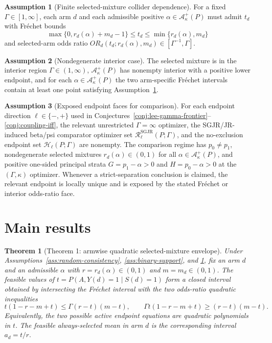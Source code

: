 \documentclass[11pt]{article}
\theoremstyle{definition}
\newtheorem{assumption}{Assumption}
\theoremstyle{plain}
\newtheorem{theorem}{Theorem}
\theoremstyle{remark}
\begin{document}
\begin{assumption}[Finite selected-mixture collider dependence]\label{ass:gamma-mixture}
For a fixed \(\Gamma\in[1,\infty]\), each arm \(d\) and each admissible positive \(\alpha\in\mathcal A_\kappa^+(P)\) must admit \(t_d\) with Fréchet bounds
\[
  \max\{0,r_d(\alpha)+m_d-1\}\le t_d\le \min\{r_d(\alpha),m_d\}
\]
and selected-arm odds ratio \(OR_d(t_d;r_d(\alpha),m_d)\in[\Gamma^{-1},\Gamma]\).
\end{assumption}

\begin{assumption}[Nondegenerate interior case]\label{ass:interior}
The selected mixture is in the interior region \(\Gamma\in(1,\infty)\), \(\mathcal A_\kappa^+(P)\) has nonempty interior with a positive lower endpoint, and for each \(\alpha\in\mathcal A_\kappa^+(P)\) the two arm-specific Fréchet intervals contain at least one point satisfying Assumption~\ref{ass:gamma-mixture}.
\end{assumption}

\begin{assumption}[Exposed endpoint faces for comparison]\label{ass:exposed-endpoints}
For each endpoint direction \(\ell\in\{-,+\}\) used in Conjectures~\ref{conj:lee-gamma-frontier}--\ref{conj:coupling-iff}, the relevant unrestricted \(\Gamma=\infty\) optimizer, the SGJR/JR-induced beta/psi comparator optimizer set \(\mathcal R_\ell^{\mathrm{SGJR}}(P;\Gamma)\), and the no-exclusion endpoint set \(\mathcal H_\ell(P;\Gamma)\) are nonempty.  The comparison regime has \(p_0\ne p_1\), nondegenerate selected mixtures \(r_d(\alpha)\in(0,1)\) for all \(\alpha\in\mathcal A_\kappa^+(P)\), and positive one-sided principal strata \(G=p_1-\alpha>0\) and \(H=p_0-\alpha>0\) at the \((\Gamma,\kappa)\) optimizer.  Whenever a strict-separation conclusion is claimed, the relevant endpoint is locally unique and is exposed by the stated Fréchet or interior odds-ratio face.
\end{assumption}

\section{Main results}
\begin{theorem}[Theorem 1: armwise quadratic selected-mixture envelope]\label{thm:arm-quadratic}
Under Assumptions~\ref{ass:random-consistency}, \ref{ass:binary-support}, and \ref{ass:gamma-mixture}, fix an arm \(d\) and an admissible \(\alpha\) with \(r=r_d(\alpha)\in(0,1)\) and \(m=m_d\in(0,1)\).  The feasible values of \(t=P(A,Y(d)=1\mid S(d)=1)\) form a closed interval obtained by intersecting the Fréchet interval with the two odds-ratio quadratic inequalities
\[
  t(1-r-m+t)\le \Gamma(r-t)(m-t),
  \qquad
  \Gamma t(1-r-m+t)\ge (r-t)(m-t).
\]
Equivalently, the two possible active endpoint equations are quadratic polynomials in \(t\).  The feasible always-selected mean in arm \(d\) is the corresponding interval \(a_d=t/r\).
\end{theorem}
\end{document}

